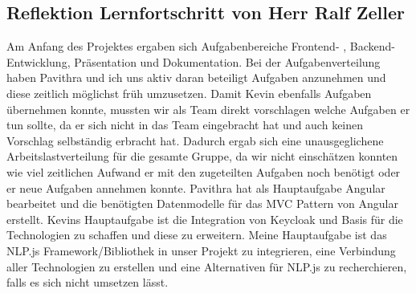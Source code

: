 \newpage
\subsection{Reflektion Lernfortschritt von Herr Ralf Zeller}

\noindent Am Anfang des Projektes ergaben sich Aufgabenbereiche Frontend- , Backend- Entwicklung, Präsentation und Dokumentation.
Bei der Aufgabenverteilung haben Pavithra und ich uns aktiv daran beteiligt Aufgaben anzunehmen und diese zeitlich möglichst früh umzusetzen.
Damit Kevin ebenfalls Aufgaben übernehmen konnte, mussten wir als Team direkt vorschlagen welche Aufgaben er tun sollte,
da er sich nicht in das Team eingebracht hat und auch keinen Vorschlag selbständig erbracht hat.
Dadurch ergab sich eine unausgeglichene Arbeitslastverteilung für die gesamte Gruppe,
da wir nicht einschätzen konnten wie viel zeitlichen Aufwand er mit den zugeteilten Aufgaben noch benötigt oder
er neue Aufgaben annehmen konnte.
Pavithra hat als Hauptaufgabe Angular bearbeitet und die benötigten Datenmodelle für das MVC Pattern von Angular erstellt.
Kevins Hauptaufgabe ist die Integration von Keycloak und Basis für die Technologien zu schaffen und diese zu erweitern.
Meine Hauptaufgabe ist das NLP.js Framework/Bibliothek in unser Projekt zu integrieren,
eine Verbindung aller Technologien zu erstellen und eine Alternativen für NLP.js zu recherchieren,
falls es sich nicht umsetzen lässt.


